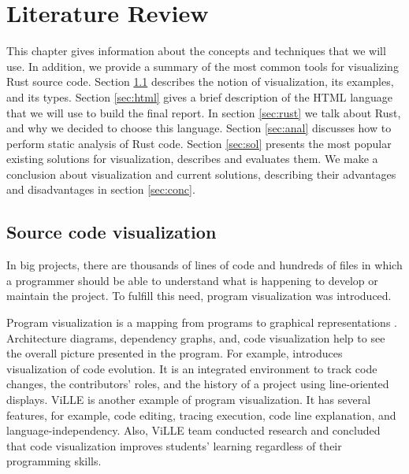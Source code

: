 \chapter{Literature Review}
\label{chap:lr}

This chapter gives information about the concepts and techniques that we will use.
In addition, we provide a summary of the most common tools for visualizing Rust source code.
Section \ref{sec:vis} describes the notion of visualization, its examples, and its types.
Section \ref{sec:html} gives a brief description of the HTML language that we will use to build the final report.
In section \ref{sec:rust} we talk about Rust, and why we decided to choose this language.
Section \ref{sec:anal} discusses how to perform static analysis of Rust code.
Section \ref{sec:sol} presents the most popular existing solutions for visualization, describes and evaluates them.
We make a conclusion about visualization and current solutions, describing their advantages and disadvantages in section \ref{sec:conc}.



\section{Source code visualization}
\label{sec:vis}
In big projects, there are thousands of lines of code and hundreds of files in which a programmer should be able to understand what is happening to develop or maintain the project. 
To fulfill this need, program visualization was introduced.

Program visualization is a mapping from programs to graphical representations \cite{247643}. Architecture diagrams, dependency graphs, and, code visualization help to see the overall picture presented in the program. 
For example, \cite{cvsscan} introduces visualization of code evolution. It is an integrated environment to track code changes, the contributors' roles, and the history of a project using line-oriented displays.
ViLLE \cite{ville} is another example of program visualization. It has several features, for example, code editing, tracing execution, code line explanation, and language-independency. Also, ViLLE team conducted research and concluded that code visualization improves students' learning regardless of their programming skills.


